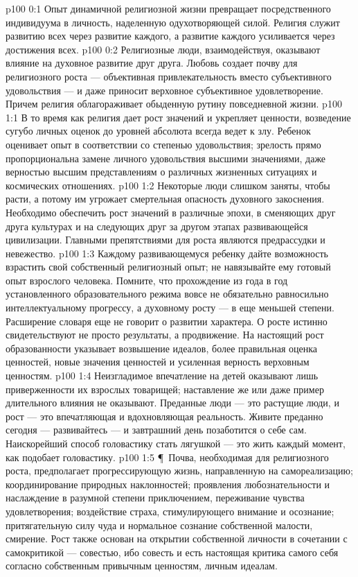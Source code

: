 \vs p100 0:1 Опыт динамичной религиозной жизни превращает посредственного индивидуума в личность, наделенную одухотворяющей силой. Религия служит развитию всех через развитие каждого, а развитие каждого усиливается через достижения всех.
\vs p100 0:2 Религиозные люди, взаимодействуя, оказывают влияние на духовное развитие друг друга. Любовь создает почву для религиозного роста --- объективная привлекательность вместо субъективного удовольствия --- и даже приносит верховное субъективное удовлетворение. Причем религия облагораживает обыденную рутину повседневной жизни.
\vs p100 1:1 В то время как религия дает рост значений и укрепляет ценности, возведение сугубо личных оценок до уровней абсолюта всегда ведет к злу. Ребенок оценивает опыт в соответствии со степенью удовольствия; зрелость прямо пропорциональна замене личного удовольствия высшими значениями, даже верностью высшим представлениям о различных жизненных ситуациях и космических отношениях.
\vs p100 1:2 Некоторые люди слишком заняты, чтобы расти, а потому им угрожает смертельная опасность духовного закоснения. Необходимо обеспечить рост значений в различные эпохи, в сменяющих друг друга культурах и на следующих друг за другом этапах развивающейся цивилизации. Главными препятствиями для роста являются предрассудки и невежество.
\vs p100 1:3 Каждому развивающемуся ребенку дайте возможность взрастить свой собственный религиозный опыт; не навязывайте ему готовый опыт взрослого человека. Помните, что прохождение из года в год установленного образовательного режима вовсе не обязательно равносильно интеллектуальному прогрессу, а духовному росту --- в еще меньшей степени. Расширение словаря еще не говорит о развитии характера. О росте истинно свидетельствуют не просто результаты, а продвижение. На настоящий рост образованности указывает возвышение идеалов, более правильная оценка ценностей, новые значения ценностей и усиленная верность верховным ценностям.
\vs p100 1:4 Неизгладимое впечатление на детей оказывают лишь приверженности их взрослых товарищей; наставление же или даже пример длительного влияния не оказывают. Преданные люди --- это растущие люди, и рост --- это впечатляющая и вдохновляющая реальность. Живите преданно сегодня --- развивайтесь --- и завтрашний день позаботится о себе сам. Наискорейший способ головастику стать лягушкой --- это жить каждый момент, как подобает головастику.
\vs p100 1:5 \P\ Почва, необходимая для религиозного роста, предполагает прогрессирующую жизнь, направленную на самореализацию; координирование природных наклонностей; проявления любознательности и наслаждение в разумной степени приключением, переживание чувства удовлетворения; воздействие страха, стимулирующего внимание и осознание; притягательную силу чуда и нормальное сознание собственной малости, смирение. Рост также основан на открытии собственной личности в сочетании с самокритикой --- совестью, ибо совесть и есть настоящая критика самого себя согласно собственным привычным ценностям, личным идеалам.
